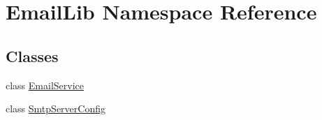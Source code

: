 \hypertarget{namespaceEmailLib}{}\section{Email\+Lib Namespace Reference}
\label{namespaceEmailLib}
\subsection*{Classes}
\begin{DoxyCompactItemize}
\item 
class \mbox{\hyperlink{classEmailLib_1_1EmailService}{Email\+Service}}
\item 
class \mbox{\hyperlink{classEmailLib_1_1SmtpServerConfig}{Smtp\+Server\+Config}}
\end{DoxyCompactItemize}
